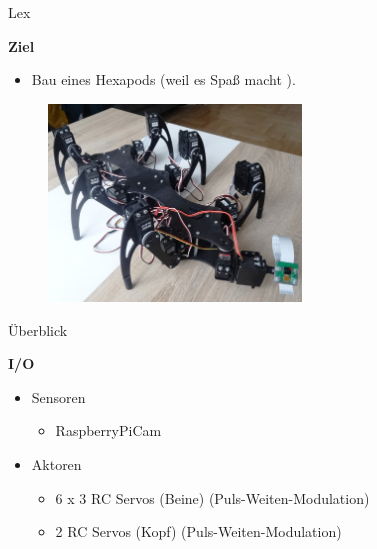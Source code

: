 \documentclass{beamer}
\begin{document}
\begin{frame}{Lex}
\begin{large}\textbf{Ziel}\end{large}
\begin{itemize}
	\item Bau eines Hexapods (weil es Spa\ss{} macht \Smiley{}).
\end{itemize}
 \begin{figure}[H]
  \centering
  \includegraphics[width=0.6\textwidth]{./images/robot-lex.jpg}
 \end{figure}
\end{frame}
\begin{frame}{\"Uberblick}
\begin{large}\textbf{I/O}\end{large}
\begin{itemize}
	\item Sensoren
	\begin{itemize}
		\item RaspberryPiCam
	\end{itemize}
	\item Aktoren
	\begin{itemize}
		\item 6 x 3 RC Servos (Beine) (Puls-Weiten-Modulation)
		\item 2 RC Servos (Kopf) (Puls-Weiten-Modulation)
	\end{itemize}
\end{itemize}
\end{frame}
\end{document}
